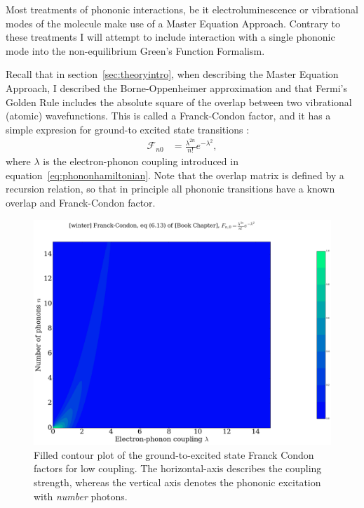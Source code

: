 Most treatments of phononic interactions, be it electroluminescence \cite{electroluminescence} or vibrational modes of the molecule \cite{vibrationcomputation} make use of a Master Equation Approach. Contrary to these treatments I will attempt to include interaction with a single phononic mode into the non-equilibrium Green's Function Formalism.

Recall that in section~\ref{sec:theoryintro}, when describing the Master Equation Approach, I described the Borne-Oppenheimer approximation and that Fermi's Golden Rule includes the absolute square of the overlap between two vibrational (atomic) wavefunctions. This is called a Franck-Condon factor, and it has a simple expresion for ground-to excited state transitions \cite{kaspermothpoulsen}:
\begin{align}
\mathscr{F}_{n0} &= \frac{\lambda^{2n}}{n!} e^{-\lambda^2},
\label{eq:fcfactor}
\end{align}
where $\lambda$ is the electron-phonon coupling introduced in equation~\ref{eq:phononhamiltonian}.  Note that the overlap matrix is defined by a recursion relation, so that in principle all phononic transitions have a known overlap and Franck-Condon factor.

\begin{figure}[!bp]
    \centering
    \includegraphics[height=.3\textheight]{png/fcfig.png}
    \caption{Filled contour plot of the ground-to-excited state Franck Condon factors for low coupling. The horizontal-axis describes the coupling strength, whereas the vertical axis denotes the phononic excitation with \emph{number} photons.}
    \label{fig:fc}
\end{figure}

